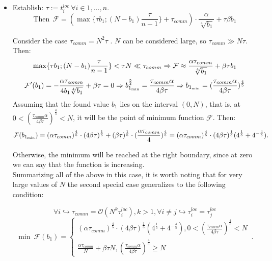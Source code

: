 \documentclass{article}
\begin{document}
\begin{itemize}
\item []
Establish: $\tau := t_i^{loc}~ \forall i \in {1,\ldots, n} $. 
\begin{equation}
        \text{Then} ~ ~\mathcal{F} = (\max\{\tau b_1; (N-b_1) \frac{\tau}{n-1}\} + \tau_{comm}) \cdot \frac{\alpha}{\sqrt[4]{b_1}}+\tau \beta b_1 
\end{equation}

Consider the case $\tau_{comm} = N^2 \tau$ . $N$ can be considered large, so $\tau_{comm} \gg N\tau$. Then:
\begin{equation}
    \notag
     \max \{\tau b_1; (N-b_1)\frac{\tau}{n-1}\} < \tau N \ll \tau_{comm}\Rightarrow \mathcal{F} \approx \frac{\alpha \tau_{comm}}{\sqrt[4]{b_1}} + \beta \tau b_1 
\end{equation}
\begin{equation}
    \notag
    \mathcal{F}' (b_1) = -\frac{\alpha \tau_{comm}}{4b_1\sqrt[4]{b_1}} + \beta \tau = 0 \Rightarrow b_{1_{\min}}^\frac{5}{4} = \frac{\tau _{comm}\alpha}{4\beta\tau}\Rightarrow b_{1_{\min}} = (\frac{\tau _{comm}\alpha}{4\beta\tau})^{\frac{4}{5}}
\end{equation}
Assuming that the found value $b_1$ lies on the interval $(0, N) $, that is, at $0 < (\frac{\tau _{comm}\alpha}{4\beta\tau})^{\frac{4}{5}} < N$, it will be the point of minimum function $\mathcal{F}$. Then:
\begin{equation}
    \notag
    \mathcal{F}(b_{1_{\min}}) = (\alpha \tau_{comm})^\frac{4}{5} \cdot (4\beta\tau)^\frac{1}{5} + (\beta \tau)^\frac{1}{5}\cdot(\frac{\alpha \tau_{comm}}{4})^\frac{4}{5} = (\alpha \tau_{comm})^\frac{4}{5}\cdot (4\beta\tau)^\frac{1}{5}(4^\frac{1}{5} + 4^{-\frac{4}{5}}).
\end{equation}
    
Otherwise, the minimum will be reached at the right boundary, since at zero we can say that the function is increasing.
    \\
Summarizing all of the above in this case, it is worth noting that for very large values of $N$ the second special case generalizes to the following condition:

\begin {equation} 
    \forall i  \hookrightarrow \tau_{comm} = \mathcal{O}( N^k \tau_i^{loc}), k >1 , \forall i\neq j\hookrightarrow \tau_i^{loc} = \tau_j^{loc}
\end {equation}
\begin {equation}          
\min ~ {\mathcal{F}}(b_1) = \begin{cases}
      (\alpha \tau_{comm})^\frac{4}{5}\cdot (4\beta\tau)^\frac{1}{5}(4^\frac{1}{5} + 4^{-\frac{4}{5}}),  0 < (\frac{\tau _{comm}\alpha}{4\beta\tau})^{\frac{4}{5}} < N\\
      \frac{\alpha\tau _{comm}}{N} + \beta \tau N , (\frac{\tau _{comm}\alpha}{4\beta\tau})^{\frac{4}{5}} \geq N
    \end{cases}\,.
\end {equation}
\end{itemize}
\end{document}
